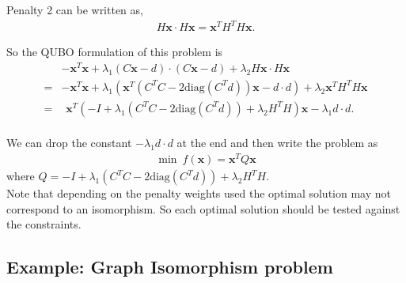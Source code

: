 \documentclass{article}
\begin{document}
\noindent Penalty 2 can be written as,
\begin{align*}
    H\mathbf{x} \cdot H\mathbf{x} = \mathbf{x}^T H^T H \mathbf{x}.
\end{align*}

\noindent So the QUBO formulation of this problem is 
\begin{align*}
    &-\mathbf{x}^T \mathbf{x} + \lambda_1(C\mathbf{x} - d)\cdot (C\mathbf{x} - d)  +\lambda_2 H\mathbf{x} \cdot H\mathbf{x}\\
    = &-\mathbf{x}^T \mathbf{x} + \lambda_1(\mathbf{x}^T( C^T C -2\text{diag}(C^T d))\mathbf{x} - d\cdot d) + \lambda_2 \mathbf{x}^T H^T H \mathbf{x}\\
    = &\hspace{5pt} \mathbf{x}^T (-I + \lambda_1( C^T C -2\text{diag}(C^T d)) + 
    \lambda_2 H^T H) \mathbf{x} - \lambda_1 d \cdot d.
\end{align*}\\
We can drop the constant \(- \lambda_1 d \cdot d\) at the end and then write the problem as
\begin{align*}
    \min \: f(\mathbf{x}) = \mathbf{x}^T Q \mathbf{x}
\end{align*}
where \(Q = -I + \lambda_1( C^T C -2\text{diag}(C^T d)) + \lambda_2 H^T H\).\\

\noindent Note that depending on the penalty weights used the optimal solution may not correspond to an isomorphism. So each optimal solution should be tested against the constraints.

\subsection{Example: Graph Isomorphism problem}






\nocite{*}
\printbibliography %
\end{document}
